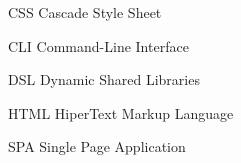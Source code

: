 \begin{siglas}
  
  \item[CSS] Cascade Style Sheet
  \item[CLI] Command-Line Interface
  \item[DSL] Dynamic Shared Libraries
  \item[HTML] HiperText Markup Language
  \item[SPA] Single Page Application
    
\end{siglas}
